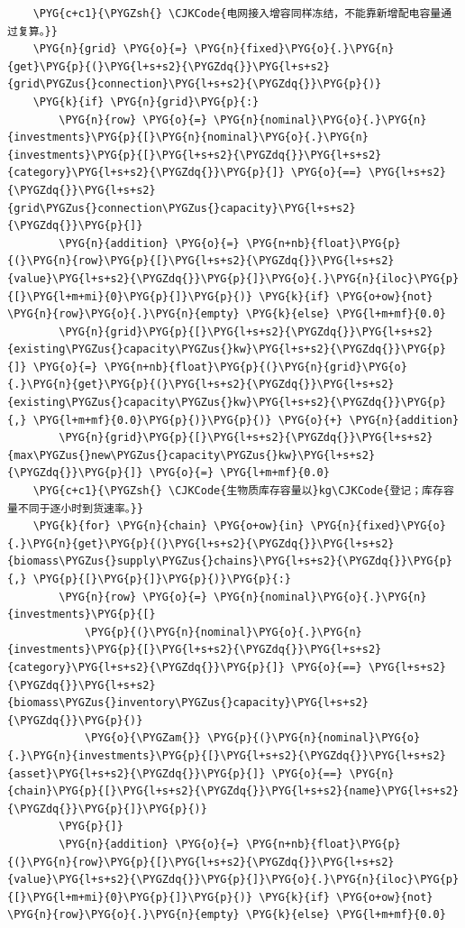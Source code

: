\begin{Verbatim}
    \PYG{c+c1}{\PYGZsh{} \CJKCode{电网接入增容同样冻结，不能靠新增配电容量通过复算。}}
    \PYG{n}{grid} \PYG{o}{=} \PYG{n}{fixed}\PYG{o}{.}\PYG{n}{get}\PYG{p}{(}\PYG{l+s+s2}{\PYGZdq{}}\PYG{l+s+s2}{grid\PYGZus{}connection}\PYG{l+s+s2}{\PYGZdq{}}\PYG{p}{)}
    \PYG{k}{if} \PYG{n}{grid}\PYG{p}{:}
        \PYG{n}{row} \PYG{o}{=} \PYG{n}{nominal}\PYG{o}{.}\PYG{n}{investments}\PYG{p}{[}\PYG{n}{nominal}\PYG{o}{.}\PYG{n}{investments}\PYG{p}{[}\PYG{l+s+s2}{\PYGZdq{}}\PYG{l+s+s2}{category}\PYG{l+s+s2}{\PYGZdq{}}\PYG{p}{]} \PYG{o}{==} \PYG{l+s+s2}{\PYGZdq{}}\PYG{l+s+s2}{grid\PYGZus{}connection\PYGZus{}capacity}\PYG{l+s+s2}{\PYGZdq{}}\PYG{p}{]}
        \PYG{n}{addition} \PYG{o}{=} \PYG{n+nb}{float}\PYG{p}{(}\PYG{n}{row}\PYG{p}{[}\PYG{l+s+s2}{\PYGZdq{}}\PYG{l+s+s2}{value}\PYG{l+s+s2}{\PYGZdq{}}\PYG{p}{]}\PYG{o}{.}\PYG{n}{iloc}\PYG{p}{[}\PYG{l+m+mi}{0}\PYG{p}{]}\PYG{p}{)} \PYG{k}{if} \PYG{o+ow}{not} \PYG{n}{row}\PYG{o}{.}\PYG{n}{empty} \PYG{k}{else} \PYG{l+m+mf}{0.0}
        \PYG{n}{grid}\PYG{p}{[}\PYG{l+s+s2}{\PYGZdq{}}\PYG{l+s+s2}{existing\PYGZus{}capacity\PYGZus{}kw}\PYG{l+s+s2}{\PYGZdq{}}\PYG{p}{]} \PYG{o}{=} \PYG{n+nb}{float}\PYG{p}{(}\PYG{n}{grid}\PYG{o}{.}\PYG{n}{get}\PYG{p}{(}\PYG{l+s+s2}{\PYGZdq{}}\PYG{l+s+s2}{existing\PYGZus{}capacity\PYGZus{}kw}\PYG{l+s+s2}{\PYGZdq{}}\PYG{p}{,} \PYG{l+m+mf}{0.0}\PYG{p}{)}\PYG{p}{)} \PYG{o}{+} \PYG{n}{addition}
        \PYG{n}{grid}\PYG{p}{[}\PYG{l+s+s2}{\PYGZdq{}}\PYG{l+s+s2}{max\PYGZus{}new\PYGZus{}capacity\PYGZus{}kw}\PYG{l+s+s2}{\PYGZdq{}}\PYG{p}{]} \PYG{o}{=} \PYG{l+m+mf}{0.0}
    \PYG{c+c1}{\PYGZsh{} \CJKCode{生物质库存容量以}kg\CJKCode{登记；库存容量不同于逐小时到货速率。}}
    \PYG{k}{for} \PYG{n}{chain} \PYG{o+ow}{in} \PYG{n}{fixed}\PYG{o}{.}\PYG{n}{get}\PYG{p}{(}\PYG{l+s+s2}{\PYGZdq{}}\PYG{l+s+s2}{biomass\PYGZus{}supply\PYGZus{}chains}\PYG{l+s+s2}{\PYGZdq{}}\PYG{p}{,} \PYG{p}{[}\PYG{p}{]}\PYG{p}{)}\PYG{p}{:}
        \PYG{n}{row} \PYG{o}{=} \PYG{n}{nominal}\PYG{o}{.}\PYG{n}{investments}\PYG{p}{[}
            \PYG{p}{(}\PYG{n}{nominal}\PYG{o}{.}\PYG{n}{investments}\PYG{p}{[}\PYG{l+s+s2}{\PYGZdq{}}\PYG{l+s+s2}{category}\PYG{l+s+s2}{\PYGZdq{}}\PYG{p}{]} \PYG{o}{==} \PYG{l+s+s2}{\PYGZdq{}}\PYG{l+s+s2}{biomass\PYGZus{}inventory\PYGZus{}capacity}\PYG{l+s+s2}{\PYGZdq{}}\PYG{p}{)}
            \PYG{o}{\PYGZam{}} \PYG{p}{(}\PYG{n}{nominal}\PYG{o}{.}\PYG{n}{investments}\PYG{p}{[}\PYG{l+s+s2}{\PYGZdq{}}\PYG{l+s+s2}{asset}\PYG{l+s+s2}{\PYGZdq{}}\PYG{p}{]} \PYG{o}{==} \PYG{n}{chain}\PYG{p}{[}\PYG{l+s+s2}{\PYGZdq{}}\PYG{l+s+s2}{name}\PYG{l+s+s2}{\PYGZdq{}}\PYG{p}{]}\PYG{p}{)}
        \PYG{p}{]}
        \PYG{n}{addition} \PYG{o}{=} \PYG{n+nb}{float}\PYG{p}{(}\PYG{n}{row}\PYG{p}{[}\PYG{l+s+s2}{\PYGZdq{}}\PYG{l+s+s2}{value}\PYG{l+s+s2}{\PYGZdq{}}\PYG{p}{]}\PYG{o}{.}\PYG{n}{iloc}\PYG{p}{[}\PYG{l+m+mi}{0}\PYG{p}{]}\PYG{p}{)} \PYG{k}{if} \PYG{o+ow}{not} \PYG{n}{row}\PYG{o}{.}\PYG{n}{empty} \PYG{k}{else} \PYG{l+m+mf}{0.0}

\end{Verbatim}
